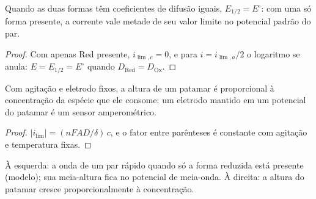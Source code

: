 \begin{corollary}\label{cor:b2:current-potential-curves:half-wave}
Quando as duas formas têm coeficientes de difusão iguais, $E_{1/2} = E^\circ$:
com uma só forma presente, a corrente vale metade de seu valor limite no
potencial padrão do par.
\end{corollary}

\begin{proof}
Com apenas Red presente, $i_{\lim,c} = 0$, e para $i = i_{\lim,a}/2$ o logaritmo
se anula: $E = E_{1/2} = E^\circ$ quando $D_{\text{Red}} = D_{\text{Ox}}$.
\end{proof}

\begin{proposition}\label{prop:b2:current-potential-curves:plateau}
Com agitação e eletrodo fixos, a altura de um patamar é proporcional à
concentração da espécie que ele consome: um eletrodo mantido em um
potencial do patamar é um sensor amperométrico.
\end{proposition}

\begin{proof}
$|i_{\lim}| = (nFAD/\delta)\,c$, e o fator entre parênteses é constante com
agitação e temperatura fixas.
\end{proof}

\begin{omfigure}
\hfill
{}

{\small À esquerda: a onda de um par rápido quando só a forma reduzida está
presente (modelo); sua meia-altura fica no potencial de meia-onda. À direita:
a altura do patamar cresce proporcionalmente à concentração.}
\end{omfigure}

